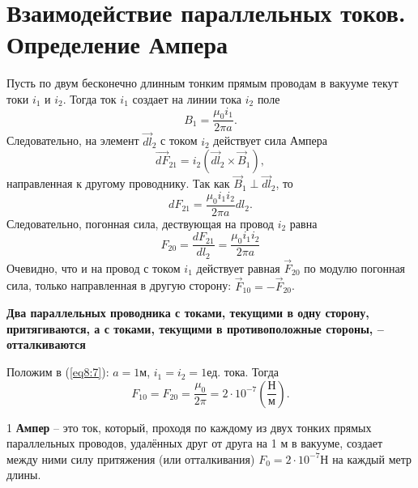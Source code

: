 \section{Взаимодействие параллельных токов. Определение Ампера}

    Пусть по двум бесконечно длинным тонким прямым проводам в вакууме текут токи
    \( i_1 \) и \( i_2 \). Тогда ток \( i_1 \) создает на линии тока \( i_2 \)
    поле
    \[
        B_1 = \frac{\mu_0 i_1}{2\pi a}.
    \]
    Следовательно, на элемент \( \vec{dl}_2 \) с током \( i_2 \) действует сила
    Ампера
    \[
        \vec{dF}_{21} = i_2(\vec{dl}_2\times\vec{B}_1),
    \]
    направленная к другому проводнику. Так как \( \vec{B}_1 \perp \vec{dl}_2 \),
    то
    \[
        dF_{21} = \frac{\mu_0 i_1i_2}{2\pi a}dl_2.
    \]
    Следовательно, погонная сила, дествующая на провод \( i_2 \) равна
    \begin{equation}
        F_{20} = \frac{dF_{21}}{dl_2} = \frac{\mu_0 i_1 i_2}{2\pi a}
        \label{eq8:7}
    \end{equation}
    Очевидно, что и на провод с током \( i_1 \) действует равная
    \( \vec{F}_{20} \) по модулю погонная сила, только направленная в другую
    сторону: \( \vec{F}_{10} = - \vec{F}_{20} \).
    
    \textbf{Два параллельных проводника с токами, текущими в одну сторону,
    притягиваются, а с токами, текущими в противоположные стороны, --
    отталкиваются}
    
    Положим в (\ref{eq8:7}): \( a = 1 \)м, \( i_1 = i_2 = 1\)ед. тока. Тогда
    \[
        F_{10} = F_{20} = \frac{\mu_0}{2\pi} =
        2 \cdot 10^{-7} \left(\frac{\text{Н}}{\text{м}}\right).
    \]
    
    \begin{definition}
        1 \textbf{Ампер} -- это ток, который, проходя по каждому из двух тонких
        прямых параллельных проводов, удалённых друг от друга на 1 м в вакууме,
        создает между ними силу притяжения (или отталкивания)
        \( F_0 = 2 \cdot 10^{-7} \)Н на каждый метр длины.
    \end{definition}
    
